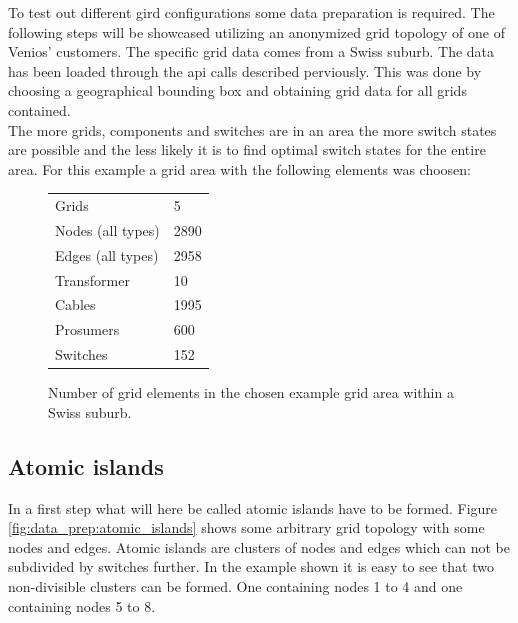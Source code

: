 
To test out different gird configurations some data preparation is required. The following
steps will be showcased utilizing an anonymized grid topology of one of Venios' customers. 
The specific grid data comes from a Swiss suburb. The data has been loaded through the api calls
described perviously. This was done by choosing a geographical bounding box and obtaining grid
data for all grids contained.\\
The more grids, components and switches are in an area the more switch states are possible
and the less likely it is to find optimal switch states for the entire area. For this example
a grid area with the following elements was choosen:

\begin{figure}[H]
    \begin{center}
        \begin{tabular}{ll}
            Grids & 5\\
            Nodes (all types) & 2890\\
            Edges (all types) & 2958\\
            Transformer & 10\\
            Cables & 1995\\
            Prosumers & 600\\
            Switches & 152\\
        \end{tabular}
    \end{center}
    \caption{
        Number of grid elements in the chosen example grid area within a Swiss suburb.
    }
    \label{table:data_prep:swiss_suburban_numbers}
\end{figure}

\subsection{Atomic islands}

In a first step what will here be called atomic islands have to be formed. Figure \ref{fig:data_prep:atomic_islands}
shows some arbitrary grid topology with some nodes and edges. Atomic islands are clusters
of nodes and edges which can not be subdivided by switches further. In the example shown
it is easy to see that two non-divisible clusters can be formed. One containing nodes
1 to 4 and one containing nodes 5 to 8.

